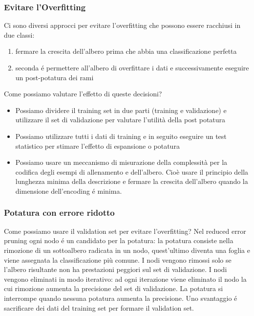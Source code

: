 \documentclass{article}
\begin{document}
\subsubsection{Evitare l'Overfitting}
Ci sono diversi approcci per evitare l'overfitting che possono essere racchiusi in due classi:
\begin{enumerate}
    \item fermare la crescita dell'albero prima che abbia una classificazione perfetta
    \item seconda é permettere all'albero di overfittare i dati e successivamente eseguire un post-potatura dei rami
\end{enumerate}
Come possiamo valutare l'effetto di queste decisioni?
\begin{itemize}
    \item Possiamo dividere il training set in due parti (training e validazione) e utilizzare il set di validazione per valutare l'utilità della post potatura
    \item Possiamo utilizzare tutti i dati di training e in seguito eseguire un test statistico per stimare l'effetto di espansione o potatura
    \item Possiamo usare un meccanismo di misurazione della complessità per la codifica degli esempi di allenamento e dell'albero. Cioè usare il principio della lunghezza minima della descrizione e fermare la crescita dell'albero quando la dimensione dell'encoding é minima.
\end{itemize}

\subsubsection{Potatura con errore ridotto}
Come possiamo usare il validation set per evitare l'overfitting? Nel reduced error pruning ogni nodo é un candidato per la potatura: la potatura consiste nella rimozione di un sottoalbero radicata in un nodo, quest'ultimo diventa una foglia e viene assegnata la classificazione più comune. I nodi vengono rimossi solo se l'albero risultante non ha prestazioni peggiori sul set di validazione. I nodi vengono eliminati in modo iterativo: ad ogni iterazione viene eliminato il nodo la cui rimozione aumenta la precisione del set di validazione. La potatura si interrompe quando nessuna potatura aumenta la precisione. Uno svantaggio é sacrificare dei dati del training set per formare il validation set.
\end{document}
